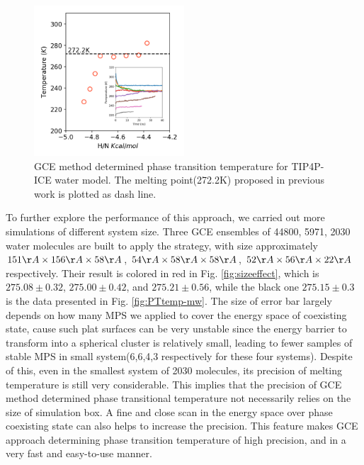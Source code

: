\documentclass[aps,prl,twocolumn,superscriptaddress]{revtex4-1}
\begin{document}
 \begin{figure}[ht]
\centering{}\includegraphics[width=0.5\textwidth]{PTtemp-ICE-insec.png} 
\caption{GCE method determined phase transition temperature for TIP4P-ICE water model. The melting point(272.2K) proposed in previous work\cite{Abascal2005} is plotted as dash line. 
\label{fig:PTtemp-ICE}} 
\end{figure}

To further explore the performance of this approach, we carried out more simulations of different system size. Three GCE ensembles of 44800, 5971, 2030 water molecules are built  to apply the strategy, with size approximately $151\AA \times  156 \AA \times  58 \AA$, $54 \AA \times  58 \AA \times  58 \AA$, $52\AA \times  56 \AA \times  22\AA$ respectively.  Their result is colored in red in Fig. \ref{fig:sizeeffect},  which is $275.08\pm 0.32$, $275.00\pm 0.42$, and $275.21\pm 0.56$, while the black one $275.15\pm 0.3$ is the data presented in Fig. \ref{fig:PTtemp-mw}. The size of error bar largely depends on how many MPS we applied to cover the  energy space of coexisting state, cause such plat surfaces can be very unstable since the energy barrier to transform into a spherical cluster is relatively small, leading to fewer samples of stable MPS in small system(6,6,4,3 respectively for these four systems). Despite of this, even in the smallest system of 2030 molecules, its precision of melting temperature is still very considerable. This implies that the precision of GCE method determined phase transitional temperature not necessarily relies on the size of simulation box. A fine and close scan in the energy space over phase coexisting state can also helps to increase the precision. This feature makes GCE approach determining phase transition temperature of high precision, and in a very fast and easy-to-use manner.
\end{document}
